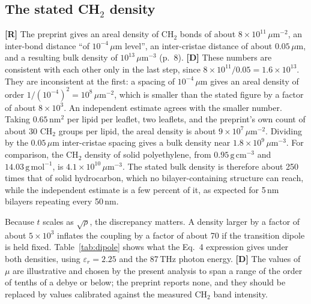 \documentclass[11pt]{article}
\newcommand{\stR}{\textbf{\textcolor{blue!55!black}{[R]}}}
\newcommand{\stD}{\textbf{\textcolor{green!40!black}{[D]}}}
\theoremstyle{plain}
\theoremstyle{definition}
\theoremstyle{remark}
\begin{document}
\subsection{The stated \texorpdfstring{CH$_2$}{CH2} density}

\stR{} The preprint gives an areal density of CH$_2$ bonds of about $8\times10^{11}\,\mu\mathrm{m}^{-2}$, an inter-bond distance ``of $10^{-4}\,\mu$m level'', an inter-cristae distance of about $0.05\,\mu\mathrm{m}$, and a resulting bulk density of $10^{13}\,\mu\mathrm{m}^{-3}$ (p.~8). \stD{} These numbers are consistent with each other only in the last step, since $8\times10^{11}/0.05=1.6\times10^{13}$. They are inconsistent at the first: a spacing of $10^{-4}\,\mu$m gives an areal density of order $1/(10^{-4})^2=10^{8}\,\mu\mathrm{m}^{-2}$, which is smaller than the stated figure by a factor of about $8\times10^{3}$. An independent estimate agrees with the smaller number. Taking $0.65\,\mathrm{nm}^2$ per lipid per leaflet, two leaflets, and the preprint's own count of about 30 CH$_2$ groups per lipid, the areal density is about $9\times10^{7}\,\mu\mathrm{m}^{-2}$. Dividing by the $0.05\,\mu\mathrm{m}$ inter-cristae spacing gives a bulk density near $1.8\times10^{9}\,\mu\mathrm{m}^{-3}$. For comparison, the CH$_2$ density of solid polyethylene, from $0.95\,\mathrm{g\,cm^{-3}}$ and $14.03\,\mathrm{g\,mol^{-1}}$, is $4.1\times10^{10}\,\mu\mathrm{m}^{-3}$. The stated bulk density is therefore about 250 times that of solid hydrocarbon, which no bilayer-containing structure can reach, while the independent estimate is a few percent of it, as expected for 5\,nm bilayers repeating every 50\,nm.

Because $t$ scales as $\sqrt\rho$, the discrepancy matters. A density larger by a factor of about $5\times10^{3}$ inflates the coupling by a factor of about 70 if the transition dipole is held fixed. Table~\ref{tab:dipole} shows what the Eq.~4 expression gives under both densities, using $\varepsilon_r=2.25$ and the 87\,THz photon energy. \stD{} The values of $\mu$ are illustrative and chosen by the present analysis to span a range of the order of tenths of a debye or below; the preprint reports none, and they should be replaced by values calibrated against the measured CH$_2$ band intensity.
\end{document}
